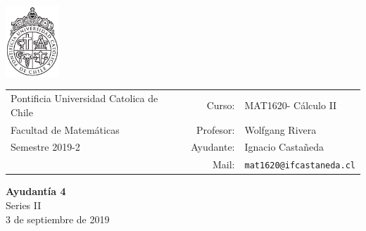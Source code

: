\documentclass[12pt]{article}
\makeatletter
\newcommand{\ayudantia}{{\sc Ayudantía 4}}
\newcommand{\tituloayu}{Series II}
\newcommand{\fecha}{3 de septiembre de 2019}
\newcommand{\sigla}{MAT1620}
\newcommand{\nombre}{Cálculo II}
\newcommand{\profesor}{Wolfgang Rivera}
\newcommand{\ano}{2019}
\newcommand{\semestre}{2}
\newcommand{\mail}{mat1620@ifcastaneda.cl}
\makeatother
\begin{document}
\thispagestyle{empty}

\begin{minipage}{2cm}
	\includegraphics[width=2cm]{../../../../img/logo.pdf}
	\vspace{0.5cm}
\end{minipage}
\begin{minipage}{\linewidth}
	\begin{tabular}{lrl}
		{\scriptsize\sc Pontificia Universidad Catolica de Chile} & \hspace*{0.7in}Curso: &
		\sigla  - \nombre\\
		{\sc Facultad de Matemáticas}&
		Profesor: & \profesor \\
		{\sc Semestre \ano-\semestre} & Ayudante: & {Ignacio Castañeda}\\
		& {Mail:} & \texttt{\mail}
	\end{tabular}
\end{minipage}

\vspace{-10mm}
\begin{center}
	{\LARGE\bf \ayudantia}\\
	\vspace{0.1cm}
	{\tituloayu}\\
	\vspace{0.1cm}
	\fecha\\
	\vspace{0.4cm}
\end{center}
\end{document}

